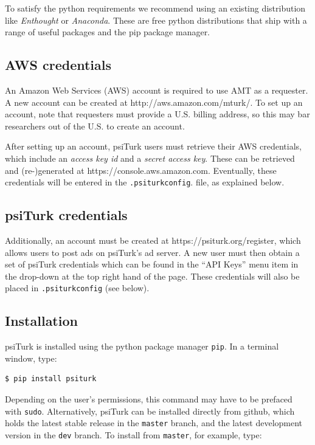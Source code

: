 \documentclass[twocolumn]{svjour3}          %
\begin{document}
To satisfy the python requirements we recommend using an existing distribution like \emph{Enthought} or \emph{Anaconda}. These are free
python distributions that ship with a range of useful packages and the pip package manager. 

\subsection{AWS credentials}
An Amazon Web Services (AWS) account is required to use AMT as a requester. A new account can be created at \textsf{http://aws.amazon.com/mturk/}. 
To set up an account, note that requesters
must provide a U.S. billing address, so this may bar researchers out of the U.S. to create an account. 

After setting up an account, psiTurk users must retrieve their AWS credentials, which include an \emph{access key id} and a
\emph{secret access key}. These can be retrieved and (re-)generated at \textsf{https://console.aws.amazon.com}.
Eventually, these credentials will be entered in the \texttt{.psiturkconfig}. file, as explained below.


\subsection{psiTurk credentials}
Additionally, an account must be created at \textsf{https://psiturk.org/register}, which allows users to 
post ads on psiTurk's ad server. A new user must then obtain a set of psiTurk credentials which can be found in 
the ``API Keys'' menu item in the drop-down at the top right hand of the page.
These credentials will also be placed in \texttt{.psiturkconfig} (see below).


\subsection{Installation}
psiTurk is installed using the python package manager \texttt{pip}. In a terminal window, type:

\begin{lstlisting}
$ pip install psiturk
\end{lstlisting}

Depending on the user's permissions, this command may have to be prefaced with \texttt{sudo}.
Alternatively, psiTurk can be installed directly from github, which holds the latest stable
release in the \texttt{master} branch, and the latest development version in the \texttt{dev} branch. 
To install from \texttt{master}, for example, type:
\end{document}
